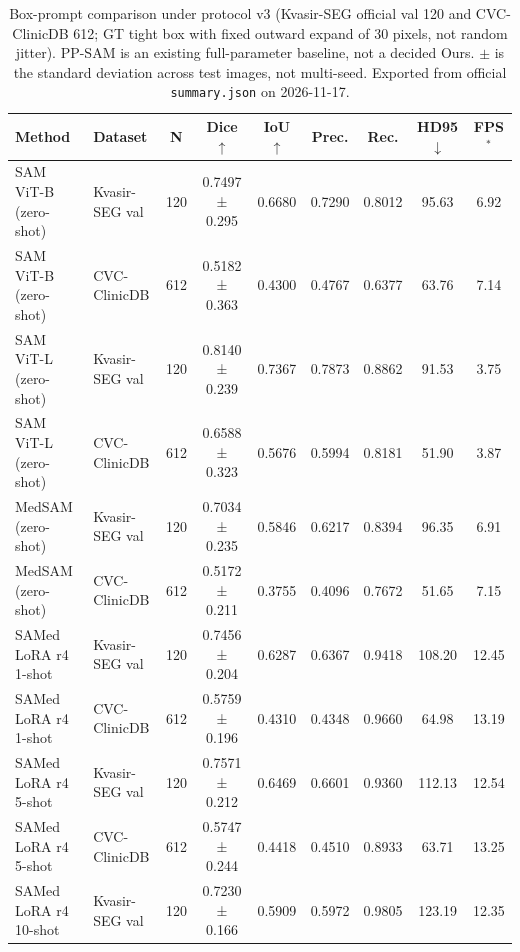\begin{table}[ht]
\centering
\caption{Box-prompt comparison under protocol v3 (Kvasir-SEG official val 120 and CVC-ClinicDB 612; GT tight box with fixed outward expand of 30 pixels, not random jitter). PP-SAM is an existing full-parameter baseline, not a decided Ours. $\pm$ is the standard deviation across test images, not multi-seed. Exported from official \texttt{summary.json} on 2026-11-17.}
\label{tab:main-boxprompt}
\begin{tabular}{llccccccc}
\toprule
Method & Dataset & N & Dice $\uparrow$ & IoU $\uparrow$ & Prec. & Rec. & HD95 $\downarrow$ & FPS$^*$ \\
\midrule
SAM ViT-B (zero-shot) & Kvasir-SEG val & 120 & 0.7497 ± 0.295 & 0.6680 & 0.7290 & 0.8012 & 95.63 & 6.92 \\
SAM ViT-B (zero-shot) & CVC-ClinicDB & 612 & 0.5182 ± 0.363 & 0.4300 & 0.4767 & 0.6377 & 63.76 & 7.14 \\
SAM ViT-L (zero-shot) & Kvasir-SEG val & 120 & 0.8140 ± 0.239 & 0.7367 & 0.7873 & 0.8862 & 91.53 & 3.75 \\
SAM ViT-L (zero-shot) & CVC-ClinicDB & 612 & 0.6588 ± 0.323 & 0.5676 & 0.5994 & 0.8181 & 51.90 & 3.87 \\
MedSAM (zero-shot) & Kvasir-SEG val & 120 & 0.7034 ± 0.235 & 0.5846 & 0.6217 & 0.8394 & 96.35 & 6.91 \\
MedSAM (zero-shot) & CVC-ClinicDB & 612 & 0.5172 ± 0.211 & 0.3755 & 0.4096 & 0.7672 & 51.65 & 7.15 \\
SAMed LoRA r4 1-shot & Kvasir-SEG val & 120 & 0.7456 ± 0.204 & 0.6287 & 0.6367 & 0.9418 & 108.20 & 12.45 \\
SAMed LoRA r4 1-shot & CVC-ClinicDB & 612 & 0.5759 ± 0.196 & 0.4310 & 0.4348 & 0.9660 & 64.98 & 13.19 \\
SAMed LoRA r4 5-shot & Kvasir-SEG val & 120 & 0.7571 ± 0.212 & 0.6469 & 0.6601 & 0.9360 & 112.13 & 12.54 \\
SAMed LoRA r4 5-shot & CVC-ClinicDB & 612 & 0.5747 ± 0.244 & 0.4418 & 0.4510 & 0.8933 & 63.71 & 13.25 \\
SAMed LoRA r4 10-shot & Kvasir-SEG val & 120 & 0.7230 ± 0.166 & 0.5909 & 0.5972 & 0.9805 & 123.19 & 12.35 \\

\end{tabular}
\end{table}
